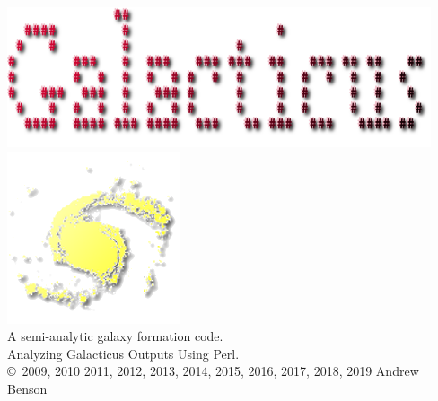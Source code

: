 \documentclass[letterpaper,10pt,headsepline]{scrbook}
\begin{document}
\lstset{language=[95]Fortran}

\frontmatter

\pagestyle{empty}
\begin{center}
\includegraphics[width=125mm]{GalacticusLogo.png}\\

\includegraphics{New_Logo_Galaxy_192_Transparent.png}\\
A semi-analytic galaxy formation code.\\
Analyzing Galacticus Outputs Using Perl.\\

\copyright\ 2009, 2010 2011, 2012, 2013, 2014, 2015, 2016, 2017, 2018, 2019 Andrew Benson
\end{center}

\tableofcontents

\mainmatter
\pagestyle{headings}









\backmatter




\printglossaries

\citeindextrue
\printindex
\end{document}
